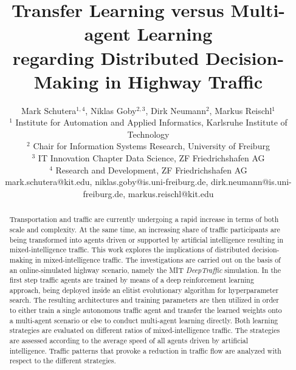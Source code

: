 \documentclass{article}
\title{Transfer Learning versus Multi-agent Learning \\
	regarding Distributed Decision-Making in Highway Traffic}
\author{
Mark Schutera$^{1, 4}$, 
Niklas Goby$^{2, 3}$, 
Dirk Neumann$^{2}$, 
Markus Reischl$^{1}$
\\ 
$^1$ Institute for Automation and Applied Informatics, Karlsruhe Institute of Technology \\
$^2$ Chair for Information Systems Research, University of Freiburg\\
$^3$ IT Innovation Chapter Data Science, ZF Friedrichshafen AG\\
$^4$ Research and Development, ZF Friedrichshafen AG\\
mark.schutera@kit.edu,
niklas.goby@is.uni-freiburg.de,
dirk.neumann@is.uni-freiburg.de,
markus.reischl@kit.edu
}
\begin{document}
\maketitle

\begin{abstract}
  Transportation and traffic are currently undergoing a rapid increase in terms of both scale and complexity. At the same time, an increasing share of traffic participants are being transformed into agents driven or supported by artificial intelligence resulting in mixed-intelligence traffic. This work explores the implications of distributed decision-making in mixed-intelligence traffic. The investigations are carried out on the basis of an online-simulated highway scenario, namely the MIT \emph{DeepTraffic} simulation. In the first step traffic agents are trained by means of a deep reinforcement learning approach, being deployed inside an elitist evolutionary algorithm for hyperparameter search. The resulting architectures and training parameters are then utilized in order to either train a single autonomous traffic agent and transfer the learned weights onto a multi-agent scenario or else to conduct multi-agent learning directly. Both learning strategies are evaluated on different ratios of mixed-intelligence traffic. The strategies are assessed according to the average speed of all agents driven by artificial intelligence. Traffic patterns that provoke a reduction in traffic flow are analyzed with respect to the different strategies.
\end{abstract}
\end{document}
